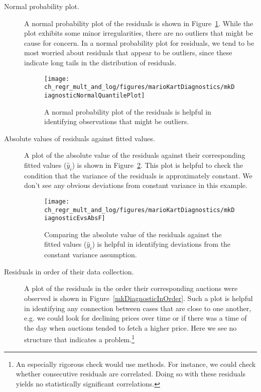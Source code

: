 \begin{description}
\item[Normal probability plot.] A normal probability plot of the residuals is shown in Figure~\ref{mkDiagnosticNormalQuantilePlot}. While the plot exhibits some minor irregularities, there are no outliers that might be cause for concern. In a normal probability plot for residuals, we tend to be most worried about residuals that appear to be outliers, since these indicate long tails in the distribution of residuals.

\begin{figure}[h]
\centering
\texttt{[image: ch\_regr\_mult\_and\_log/figures/marioKartDiagnostics/mkDiagnosticNormalQuantilePlot]}
\caption{A normal probability plot of the residuals is helpful in identifying observations that might be outliers.}
\label{mkDiagnosticNormalQuantilePlot}
\end{figure}

\item[Absolute values of residuals against fitted values.] A plot of the absolute value of the residuals against their corresponding fitted values ($\hat{y}_i$) is shown in Figure~\ref{mkDiagnosticEvsAbsF}. This plot is helpful to check the condition that the variance of the residuals is approximately constant. We don't see any obvious deviations from constant variance in this example.

\begin{figure}
\centering
\texttt{[image: ch\_regr\_mult\_and\_log/figures/marioKartDiagnostics/mkDiagnosticEvsAbsF]}
\caption{Comparing the absolute value of the residuals against the fitted values ($\hat{y}_i$) is helpful in identifying deviations from the constant variance assumption.}
\label{mkDiagnosticEvsAbsF}
\end{figure}

\item[Residuals in order of their data collection.] A plot of the residuals in the order their corresponding auctions were observed is shown in Figure~\ref{mkDiagnosticInOrder}. Such a plot is helpful in identifying any connection between cases that are close to one another, e.g. we could look for declining prices over time or if there was a time of the day when auctions tended to fetch a higher price. Here we see no structure that indicates a problem.\footnote{An especially rigorous check would use  methods. For instance, we could check whether consecutive residuals are correlated. Doing so with these residuals yields no statistically significant correlations.}


\end{description}
